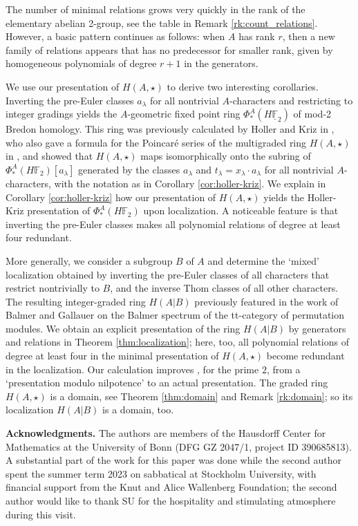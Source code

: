 \documentclass{amsart}[12pt]
\newcommand{\mF}{{\mathbb F}}
\numberwithin{equation}{section}
\theoremstyle{definition}
\begin{document}
The number of minimal relations grows very quickly in the rank of the elementary abelian
2-group, see the table in Remark \ref{rk:count_relations}. However, a basic pattern continues
as follows: when $A$ has rank $r$, then a new family of relations appears
that has no predecessor for smaller rank, given by homogeneous polynomials
of degree $r+1$ in the generators.

We use our presentation of $H(A,\star)$ to derive two interesting corollaries.
Inverting the pre-Euler classes $a_\lambda$ for all nontrivial $A$-characters
and restricting to integer gradings yields the $A$-geometric fixed point
ring $\Phi^A_*(H\underline\mF_2)$ of mod-2 Bredon homology. This ring was previously
calculated by Holler and Kriz in \cite[Theorem 2]{holler-kriz},
who also gave a formula for the Poincar{\'e} series of the multigraded ring
$H(A,\star)$ in \cite[Theorem 5]{holler-kriz},
and showed that $H(A,\star)$ maps isomorphically onto
the subring of $\Phi^A_*(H\mF_2)[a_\lambda]$ generated by the classes
$a_\lambda$ and  $t_\lambda=x_\lambda\cdot a_\lambda$ for all nontrivial $A$-characters,
with the notation as in Corollary \ref{cor:holler-kriz}.
We explain in Corollary \ref{cor:holler-kriz} how our presentation
of $H(A,\star)$ yields the Holler-Kriz presentation of  $\Phi^A_*(H\mF_2)$
upon localization.
A noticeable feature is that inverting the pre-Euler classes
makes all polynomial relations of degree at least four redundant.

More generally, we consider a subgroup $B$ of $A$ and determine the `mixed' localization
obtained by inverting the pre-Euler classes of all characters
that restrict nontrivially to $B$,
and the inverse Thom classes of all other characters.
The resulting integer-graded ring $H(A|B)$ previously featured in
the work of Balmer and Gallauer \cite{balmer-gallauer}
on the Balmer spectrum of the tt-category of permutation modules.
We obtain an explicit presentation of the ring 
$H(A|B)$ by generators and relations in Theorem \ref{thm:localization};
here, too, all polynomial relations
of degree at least four in the minimal presentation of $H(A,\star)$
become redundant in the localization.
Our calculation improves \cite[Theorem 8.13]{balmer-gallauer},
for the prime $2$, from a `presentation modulo nilpotence' to
an actual presentation.
The graded ring $H(A,\star)$ is a domain,
see Theorem \ref{thm:domain} and Remark \ref{rk:domain};
 so its localization $H(A|B)$ is a domain, too.
\smallskip

{\bf Acknowledgments.}
The authors are members of the Hausdorff Center for Mathematics
at the University of Bonn (DFG GZ 2047/1, project ID 390685813).
A substantial part of the work for this paper was done while the second author
spent the summer term 2023 on sabbatical at Stockholm University, with financial support 
from the Knut and Alice Wallenberg Foundation;
the second author would like to thank SU for the hospitality
and stimulating atmosphere during this visit.
\end{document}
